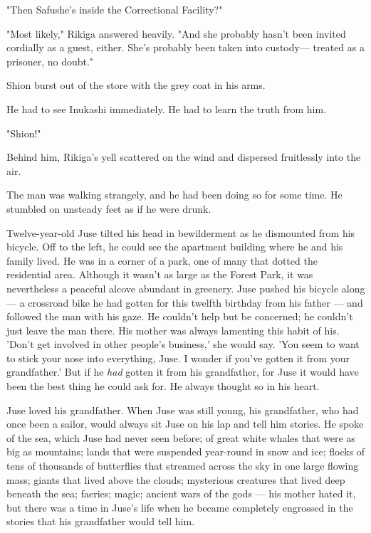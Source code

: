 "Then Safu\el she's inside the Correctional Facility?"

"Most likely," Rikiga answered heavily. "And she probably hasn't been
invited cordially as a guest, either. She's probably been taken into
custody--- treated as a prisoner, no doubt."

Shion burst out of the store with the grey coat in his arms.

He had to see Inukashi immediately. He had to learn the truth from him.

"Shion!"

Behind him, Rikiga's yell scattered on the wind and dispersed
fruitlessly into the air.

\mybreak

The man was walking strangely, and he had been doing so for some time.
He stumbled on unsteady feet as if he were drunk.

Twelve-year-old Juse tilted his head in bewilderment as he dismounted
from his bicycle. Off to the left, he could see the apartment building
where he and his family lived. He was in a corner of a park, one of many
that dotted the residential area. Although it wasn't as large as the
Forest Park, it was nevertheless a peaceful alcove abundant in greenery.
Juse pushed his bicycle along --- a crossroad bike he had gotten for this
twelfth birthday from his father --- and followed the man with his gaze.
He couldn't help but be concerned; he couldn't just leave the man there.
His mother was always lamenting this habit of his. 'Don't get involved
in other people's business,' she would say. 'You seem to want to stick
your nose into everything, Juse. I wonder if you've gotten it from your
grandfather.' But if he \emph{had} gotten it from his grandfather, for Juse it
would have been the best thing he could ask for. He always thought so in
his heart.

Juse loved his grandfather. When Juse was still young, his grandfather,
who had once been a sailor, would always sit Juse on his lap and tell
him stories. He spoke of the sea, which Juse had never seen before; of
great white whales that were as big as mountains; lands that were
suspended year-round in snow and ice; flocks of tens of thousands of
butterflies that streamed across the sky in one large flowing mass;
giants that lived above the clouds; mysterious creatures that lived deep
beneath the sea; faeries; magic; ancient wars of the gods --- his mother
hated it, but there was a time in Juse's life when he became completely
engrossed in the stories that his grandfather would tell him.


